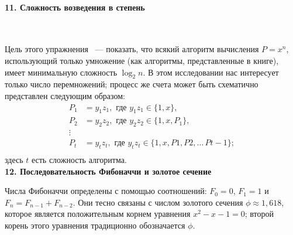 \paragraph { 11. Сложность возведения в степень}\ \newline

Цель этого упражнения ~--- показать, что всякий алгоритм вычисления $P=x^{n}$, использующий только умножение (как алгоритмы, представленные в книге), имеет минимальную сложность $\log_{2}{n}$. В этом исследовании нас интересует только число перемножений; процесс же счета может быть схематично представлен следующим образом:
\begin{equation*}
\begin{split}
P_{1}&=y_{1}z_{1}, \text{ где } y_{1}z_{1} \in{\{1,x\}},\\ 
P_{2}&=y_{2}z_{2}, \text{ где } y_{2}z_{2} \in{\{1,x,P_{1}\}},\\
\vdots\\
P_{t}&=y_{t}z_{t}, \text{ где } y_{t}z_{t} \in{\{1,x,P{1},P{2}, \dots\,P{t-1}\}};\\
\end{split}
\end{equation*}
здесь $t$ есть сложность алгоритма. \newline
\\

\noindent\textbf{12. Последовательность Фибоначчи и золотое сечение}\ \newline

Числа Фибоначчи определены с помощью соотношений: $F_{0}=0$, $F_{1}=1$ и $F_{n}=F_{n-1}+F_{n-2}$. Они тесно связаны с числом золотого сечения $\phi\approx{1,618}$, которое является положительным корнем уравнения $x^{2}-x-1=0$; второй корень этого уравнения традиционно обозначается  $\phi$. 

\pagebreak

